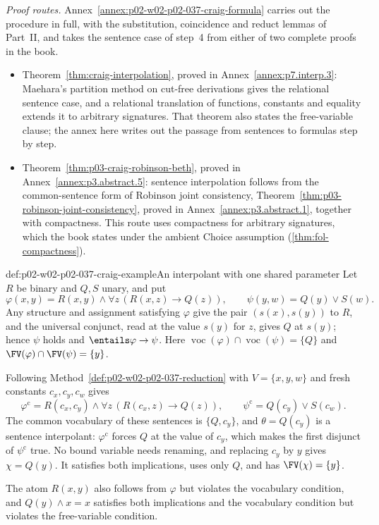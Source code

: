 \emph{Proof routes.}  Annex~\ref{annex:p02-w02-p02-037-craig-formula}
carries out the procedure in full, with the substitution, coincidence and
reduct lemmas of Part~II, and takes the sentence case of step~4 from either
of two complete proofs in the book.
\begin{itemize}
 \item Theorem~\ref{thm:craig-interpolation}, proved in
       Annex~\ref{annex:p7.interp.3}: Maehara's partition method on
       cut-free derivations gives the relational sentence case, and a
       relational translation of functions, constants and equality extends
       it to arbitrary signatures.  That theorem also states the
       free-variable clause; the annex here writes out the passage from
       sentences to formulas step by step.
 \item Theorem~\ref{thm:p03-craig-robinson-beth}, proved in
       Annex~\ref{annex:p3.abstract.5}: sentence interpolation follows from
       the common-sentence form of Robinson joint consistency,
       Theorem~\ref{thm:p03-robinson-joint-consistency}, proved in
       Annex~\ref{annex:p3.abstract.1}, together with compactness.  This
       route uses compactness for arbitrary signatures, which the book states
       under the ambient Choice assumption (\cref{thm:fol-compactness}).
\end{itemize}

\begin{hbexample}{def:p02-w02-p02-037-craig-example}{An interpolant with one shared parameter}
Let \(R\) be binary and \(Q,S\) unary, and put
\[
 \varphi(x,y)=R(x,y)\land\forall z\,(R(x,z)\to Q(z)),
 \qquad
 \psi(y,w)=Q(y)\lor S(w).
\]
Any structure and assignment satisfying \(\varphi\) give the pair
\((s(x),s(y))\) to \(R\), and the universal conjunct, read at the value
\(s(y)\) for \(z\), gives \(Q\) at \(s(y)\); hence \(\psi\) holds and
\(\entails\varphi\to\psi\).  Here
\(\operatorname{voc}(\varphi)\cap\operatorname{voc}(\psi)=\{Q\}\) and
\(\FV(\varphi)\cap\FV(\psi)=\{y\}\).

Following Method~\ref{def:p02-w02-p02-037-reduction} with
\(V=\{x,y,w\}\) and fresh constants \(c_x,c_y,c_w\) gives
\[
 \varphi^{\mathrm{c}}=R(c_x,c_y)\land\forall z\,(R(c_x,z)\to Q(z)),
 \qquad
 \psi^{\mathrm{c}}=Q(c_y)\lor S(c_w).
\]
The common vocabulary of these sentences is \(\{Q,c_y\}\), and
\(\theta=Q(c_y)\) is a sentence interpolant: \(\varphi^{\mathrm{c}}\) forces
\(Q\) at the value of \(c_y\), which makes the first disjunct of
\(\psi^{\mathrm{c}}\) true.  No bound variable needs renaming, and replacing
\(c_y\) by \(y\) gives \(\chi=Q(y)\).  It satisfies both implications,
uses only \(Q\), and has \(\FV(\chi)=\{y\}\).

The atom \(R(x,y)\) also follows from \(\varphi\) but violates the
vocabulary condition, and \(Q(y)\land x=x\) satisfies both implications
and the vocabulary condition but violates the free-variable condition.
\end{hbexample}

